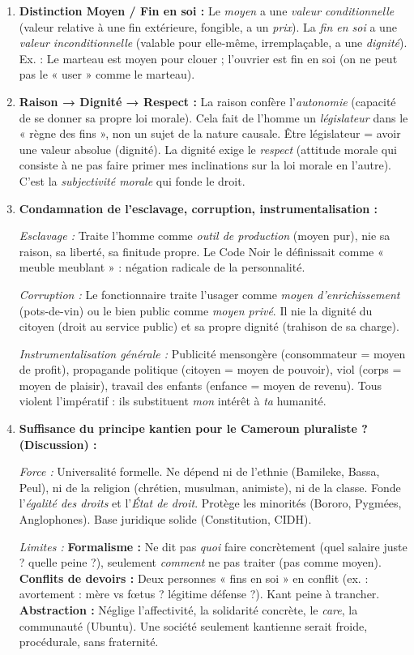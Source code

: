 \documentclass[11pt]{article}
\begin{document}
\begin{corrige}
\begin{enumerate}
\item \textbf{Distinction Moyen / Fin en soi :} Le \emph{moyen} a une \emph{valeur conditionnelle} (valeur relative à une fin extérieure, fongible, a un \emph{prix}). La \emph{fin en soi} a une \emph{valeur inconditionnelle} (valable pour elle-même, irremplaçable, a une \emph{dignité}). Ex. : Le marteau est moyen pour clouer ; l'ouvrier est fin en soi (on ne peut pas le « user » comme le marteau).
\item \textbf{Raison → Dignité → Respect :} La raison confère l'\emph{autonomie} (capacité de se donner sa propre loi morale). Cela fait de l'homme un \emph{législateur} dans le « règne des fins », non un sujet de la nature causale. Être législateur = avoir une valeur absolue (dignité). La dignité exige le \emph{respect} (attitude morale qui consiste à ne pas faire primer mes inclinations sur la loi morale en l'autre). C'est la \emph{subjectivité morale} qui fonde le droit.
\item \textbf{Condamnation de l'esclavage, corruption, instrumentalisation :}
\par \textit{Esclavage :} Traite l'homme comme \emph{outil de production} (moyen pur), nie sa raison, sa liberté, sa finitude propre. Le Code Noir le définissait comme « meuble meublant » : négation radicale de la personnalité.
\par \textit{Corruption :} Le fonctionnaire traite l'usager comme \emph{moyen d'enrichissement} (pots-de-vin) ou le bien public comme \emph{moyen privé}. Il nie la dignité du citoyen (droit au service public) et sa propre dignité (trahison de sa charge).
\par \textit{Instrumentalisation générale :} Publicité mensongère (consommateur = moyen de profit), propagande politique (citoyen = moyen de pouvoir), viol (corps = moyen de plaisir), travail des enfants (enfance = moyen de revenu). Tous violent l'impératif : ils substituent \emph{mon} intérêt à \emph{ta} humanité.
\item \textbf{Suffisance du principe kantien pour le Cameroun pluraliste ? (Discussion) :}
\par \textit{Force :} Universalité formelle. Ne dépend ni de l'ethnie (Bamileke, Bassa, Peul), ni de la religion (chrétien, musulman, animiste), ni de la classe. Fonde l'\emph{égalité des droits} et l'\emph{État de droit}. Protège les minorités (Bororo, Pygmées, Anglophones). Base juridique solide (Constitution, CIDH).
\par \textit{Limites :} \textbf{Formalisme :} Ne dit pas \emph{quoi} faire concrètement (quel salaire juste ? quelle peine ?), seulement \emph{comment} ne pas traiter (pas comme moyen). \textbf{Conflits de devoirs :} Deux personnes « fins en soi » en conflit (ex. : avortement : mère vs fœtus ? légitime défense ?). Kant peine à trancher. \textbf{Abstraction :} Néglige l'affectivité, la solidarité concrète, le \emph{care}, la communauté (Ubuntu). Une société seulement kantienne serait froide, procédurale, sans fraternité.

\end{enumerate}
\end{corrige}
\end{document}

